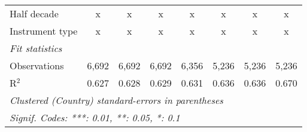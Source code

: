 \begin{tabular}{lccccccc}
   Half decade                                                                              & x            & x             & x             & x             & x             & x             & x\\  
   Instrument type                                                                          & x            & x             & x             & x             & x             & x             & x\\  
   \midrule \emph{Fit statistics}\\
   Observations                                                                             & 6,692        & 6,692         & 6,692         & 6,356         & 5,236         & 5,236         & 5,236\\  
   R$^2$                                                                                    & 0.627        & 0.628         & 0.629         & 0.631         & 0.636         & 0.636         & 0.670\\  
   \midrule
   \multicolumn{8}{l}{\emph{Clustered (Country) standard-errors in parentheses}}\\
   \multicolumn{8}{l}{\emph{Signif. Codes: ***: 0.01, **: 0.05, *: 0.1}}\\
\end{tabular}
\par\endgroup


